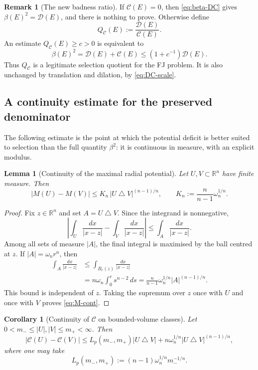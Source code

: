 \documentclass[11pt]{amsart}
\newtheorem{lemma}[theorem]{Lemma}
\newtheorem{corollary}[theorem]{Corollary}
\theoremstyle{definition}
\newtheorem{remark}[theorem]{Remark}
\newcommand{\R}{\mathbb R}
\newcommand{\Def}{\mathcal D}
\begin{document}
\begin{remark}[The new badness ratio]\label{rem:QC}
If \(\mathcal C(E)=0\), then \eqref{eq:beta-DC} gives
\(\beta(E)^2=\Def(E)\), and there is nothing to prove.  Otherwise define
\[
   Q_{\mathcal C}(E):=\frac{\Def(E)}{\mathcal C(E)}.
\tag{4.8}\label{eq:QC}
\]
An estimate \(Q_{\mathcal C}(E)\ge c>0\) is equivalent to
\[
   \beta(E)^2=\Def(E)+\mathcal C(E)
   \le(1+c^{-1})\Def(E).
\]
Thus \(Q_{\mathcal C}\) is a legitimate selection quotient for the FJ
problem.  It is also unchanged by translation and dilation, by
\eqref{eq:DC-scale}.
\end{remark}

\subsection{A continuity estimate for the preserved denominator}

The following estimate is the point at which the potential deficit is better
suited to selection than the full quantity \(\beta^2\): it is continuous in
measure, with an explicit modulus.

\begin{lemma}[Continuity of the maximal radial potential]\label{lem:M-cont}
Let \(U,V\subset\R^n\) have finite measure.  Then
\[
   |M(U)-M(V)|
   \le K_n\,|U\mathbin{\triangle}V|^{(n-1)/n},
   \qquad
   K_n:=\frac{n}{n-1}\omega_n^{1/n}.
\tag{4.9}\label{eq:M-cont}
\]
\end{lemma}

\begin{proof}
Fix \(z\in\R^n\) and set \(A=U\mathbin{\triangle}V\).  Since the integrand
is nonnegative,
\[
   \left|\int_U\frac{dx}{|x-z|}
          -\int_V\frac{dx}{|x-z|}\right|
   \le\int_A\frac{dx}{|x-z|}.
\]
Among all sets of measure \(|A|\), the final integral is maximised by the
ball centred at \(z\).  If \(|A|=\omega_n r^n\), then
\[
\begin{aligned}
   \int_A\frac{dx}{|x-z|}
   &\le\int_{B_r(z)}\frac{dx}{|x-z|} \\
   &=n\omega_n\int_0^r s^{n-2}\,ds
     =\frac{n}{n-1}\omega_n^{1/n}|A|^{(n-1)/n}.
\end{aligned}
\]
This bound is independent of \(z\).  Taking the supremum over \(z\) once
with \(U\) and once with \(V\) proves \eqref{eq:M-cont}.
\end{proof}

\begin{corollary}[Continuity of \(\mathcal C\) on bounded-volume classes]
\label{cor:C-cont}
Let \(0<m_-\le |U|,|V|\le m_+<\infty\).  Then
\[
   |\mathcal C(U)-\mathcal C(V)|
   \le L_p(m_-,m_+)|U\mathbin{\triangle}V|
      +n\omega_n^{1/n}|U\mathbin{\triangle}V|^{(n-1)/n},
\tag{4.10}\label{eq:C-cont}
\]
where one may take
\[
   L_p(m_-,m_+)
   :=(n-1)\omega_n^{1/n}m_-^{-1/n}.
\tag{4.11}\label{eq:Lp}
\]
\end{corollary}
\end{document}
